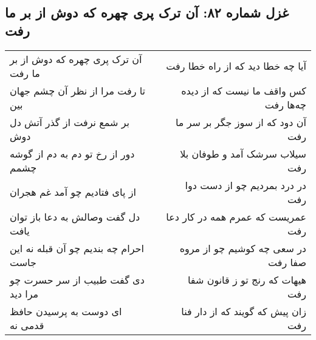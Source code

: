 \begin{center}
\section*{غزل شماره ۸۲: آن ترک پری چهره که دوش از بر ما رفت}
\label{sec:sh082}
\begin{longtable}{l p{0.5cm} r}
آن ترک پری چهره که دوش از بر ما رفت
&&
آیا چه خطا دید که از راه خطا رفت
\\
تا رفت مرا از نظر آن چشم جهان بین
&&
کس واقف ما نیست که از دیده چه‌ها رفت
\\
بر شمع نرفت از گذر آتش دل دوش
&&
آن دود که از سوز جگر بر سر ما رفت
\\
دور از رخ تو دم به دم از گوشه چشمم
&&
سیلاب سرشک آمد و طوفان بلا رفت
\\
از پای فتادیم چو آمد غم هجران
&&
در درد بمردیم چو از دست دوا رفت
\\
دل گفت وصالش به دعا باز توان یافت
&&
عمریست که عمرم همه در کار دعا رفت
\\
احرام چه بندیم چو آن قبله نه این جاست
&&
در سعی چه کوشیم چو از مروه صفا رفت
\\
دی گفت طبیب از سر حسرت چو مرا دید
&&
هیهات که رنج تو ز قانون شفا رفت
\\
ای دوست به پرسیدن حافظ قدمی نه
&&
زان پیش که گویند که از دار فنا رفت
\\
\end{longtable}
\end{center}
